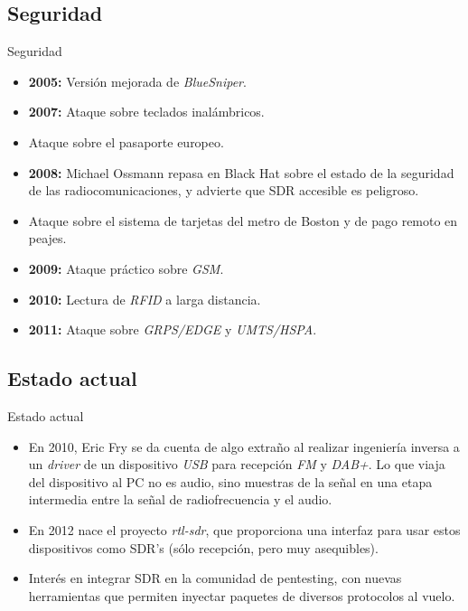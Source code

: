 \documentclass{beamer}
\begin{document}
\subsection{Seguridad}

\begin{frame}{Seguridad}

\begin{itemize}
	\item \textbf{2005:} Versión mejorada de \emph{BlueSniper}.
	\item \textbf{2007:} Ataque sobre teclados inalámbricos.
	\item Ataque sobre el pasaporte europeo.
	\item \textbf{2008:} Michael Ossmann repasa en Black Hat sobre el estado de la seguridad de las radiocomunicaciones, y advierte que SDR accesible es peligroso.
	\item Ataque sobre el sistema de tarjetas del metro de Boston y de pago remoto en peajes.
	\item \textbf{2009:} Ataque práctico sobre \emph{GSM}.
	\item \textbf{2010:} Lectura de \emph{RFID} a larga distancia.
	\item \textbf{2011:} Ataque sobre \emph{GRPS/EDGE} y \emph{UMTS/HSPA}.
\end{itemize}

\end{frame}

\subsection{Estado actual}

\begin{frame}{Estado actual}

\begin{itemize}
	\item En 2010, Eric Fry se da cuenta de algo extraño al realizar ingeniería inversa a un \emph{driver} de un dispositivo \emph{USB} para recepción \emph{FM} y \emph{DAB+}. Lo que viaja del dispositivo al PC no es audio, sino muestras de la señal en una etapa intermedia entre la señal de radiofrecuencia y el audio.
	\item En 2012 nace el proyecto \emph{rtl-sdr}, que proporciona una interfaz para usar estos dispositivos como SDR's (sólo recepción, pero muy asequibles).
	\item Interés en integrar SDR en la comunidad de pentesting, con nuevas herramientas que permiten inyectar paquetes de diversos protocolos al vuelo.
\end{itemize}

\end{frame}
\end{document}
